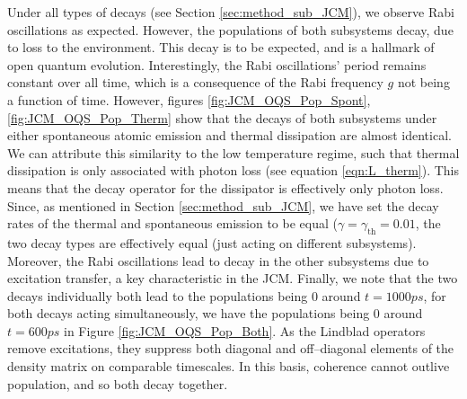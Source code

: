 \documentclass[11pt]{article}
\begin{document}
\noindent Under all types of decays (see Section \ref{sec:method_sub_JCM}), we observe Rabi oscillations as expected. However, the populations of both subsystems decay, due to loss to the environment. This decay is to be expected, and is a hallmark of open quantum evolution. Interestingly, the Rabi oscillations' period remains constant over all time, which is a consequence of the Rabi frequency $g$ not being a function of time. However, figures \ref{fig:JCM_OQS_Pop_Spont}, \ref{fig:JCM_OQS_Pop_Therm} show that the decays of both subsystems under either spontaneous atomic emission and thermal dissipation are almost identical. We can attribute this similarity to the low temperature regime, such that thermal dissipation is only associated with photon loss (see equation \eqref{eqn:L_therm}). This means that the decay operator for the dissipator is effectively only photon loss. Since, as mentioned in Section \ref{sec:method_sub_JCM}, we have set the decay rates of the thermal and spontaneous emission to be equal ($\gamma = \gamma_{\scriptscriptstyle \text{th}} =0.01$, the two decay types are effectively equal (just acting on different subsystems). Moreover, the Rabi oscillations lead to decay in the other subsystems due to excitation transfer, a key characteristic in the JCM. Finally, we note that the two decays individually both lead to the populations being 0 around $t = 1000 ps$, for both decays acting simultaneously, we have the populations being 0 around $t = 600 ps$ in Figure \ref{fig:JCM_OQS_Pop_Both}. As the Lindblad operators remove excitations, they suppress both diagonal and off--diagonal elements of the density matrix on comparable timescales. In this basis, coherence cannot outlive population, and so both decay together. 
\end{document}
